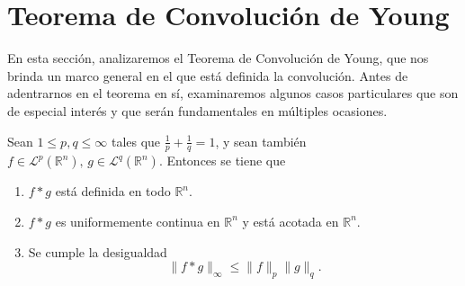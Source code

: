 \section{Teorema de Convolución de Young}

\noindent En esta sección, analizaremos el Teorema de Convolución de Young, que nos brinda un marco general en el que está definida la convolución. Antes de adentrarnos en el teorema en sí, examinaremos algunos casos particulares que son de especial interés y que serán fundamentales en múltiples ocasiones.



\begin{teorema}\label{teo:2}
Sean $1\leq p, q \leq \infty$ tales que $\frac{1}{p}+\frac{1}{q}=1$, y sean también $f\in \mathscr{L}^p(\mathbb{R}^n),\, g\in \mathscr{L}^q(\mathbb{R}^n) $. Entonces se tiene que 
\begin{enumerate}[itemsep=0.5ex]
    \item $f*g$ está definida en todo $\mathbb{R}^n$.
    \item $f*g$ es uniformemente continua en $\mathbb{R}^n$ y está acotada en $\mathbb{R}^n$.
    \item Se cumple la desigualdad
    \begin{equation}
        \|f*g\|_\infty\leq \|f\|_p \|g\|_q.
    \end{equation}  
\end{enumerate}
\end{teorema}


